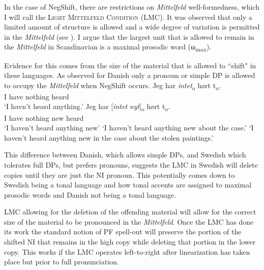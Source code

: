 \documentclass[12pt, letterpaper]{article}
\newcommand{\sub}[1]{\textsubscript{#1}}
\begin{document}
In the case of NegShift, there are restrictions on \emph{Mittelfeld} well-formedness, which I will call the \textsc{Light Mittelfeld Condition} (LMC). It was observed that only a limited amount of structure is allowed and a wide degree of variation is permitted in the \emph{Mittelfeld} (see \cite{haiderMittelfeldPhenomenaScrambling2017}). I argue that the largest unit that is allowed to remain in the \emph{Mittelfeld} in Scandinavian is a maximal prosodic word (ω\sub{max}).

Evidence for this comes from the size of the material that is allowed to ``shift" in these languages. As observed for Danish only a pronoun or simple DP is allowed to occupy the \emph{Mittelfeld} when NegShift occurs. 
\ea 
	\ea 
		\gll Jeg har \textit{intet}\textsubscript{o} hørt t\textsubscript{o}.\\
		I have nothing heard\\
		\glt  `I havn't heard anything.'
	\ex 
		\gll Jeg har [\textit{intet} \textit{nyt}]\textsubscript{o} hørt t\textsubscript{o}.\\
		I have nothing new heard\\
		\glt `I haven't heard anything new'
		\glt `I haven't heard anything new about the case.'
		\glt `I haven't heard anything new in the case about the stolen paintings.'
	\z  	
\z 

This difference between Danish, which allows simple DPs, and Swedish which tolerates full DPs, but prefers pronouns, suggests the LMC in Swedish will delete copies until they are just the NI pronoun. This potentially comes down to Swedish being a tonal language and how tonal accents are assigned to maximal prosodic words \citep{myrbergProsodicWordSwedish2013,myrbergProsodicHierarchySwedish2015,riadPhonologySwedish2014} and Danish not being a tonal language.

LMC allowing for the deletion of the offending material will allow for the correct size of the material to be pronounced in the \emph{Mittelfeld}. Once the LMC has done its work the standard notion of PF spell-out will preserve the portion of the shifted NI that remains in the high copy while deleting that portion in the lower copy. This works if the LMC operates left-to-right after linearization has taken place but prior to full pronunciation. 
\end{document}
